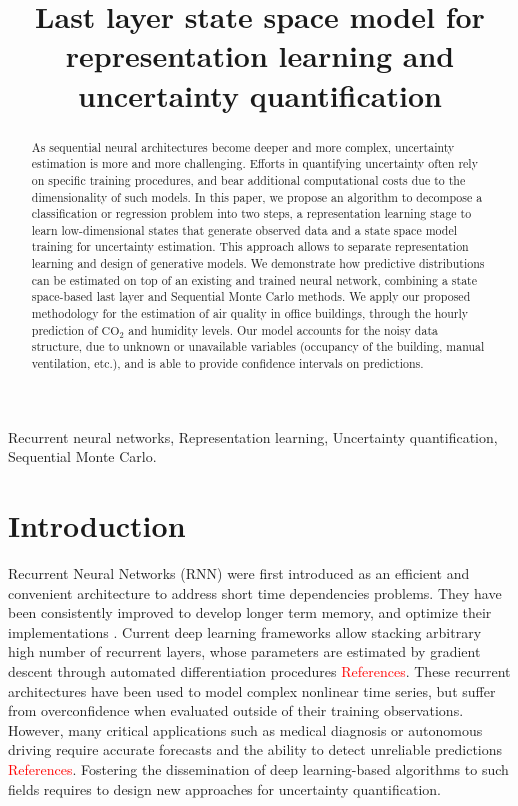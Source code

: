 \documentclass{article}
\title{Last layer state space model for representation learning and uncertainty quantification}
\begin{document}
\maketitle

\begin{abstract}
	As sequential neural architectures become deeper and more complex, uncertainty estimation is more and more challenging.
	Efforts in quantifying uncertainty often rely on specific training procedures, and bear additional computational costs due to the dimensionality of such models. In this paper, we propose an algorithm to decompose a classification or regression problem into two steps,  a representation learning stage to learn low-dimensional states that generate observed data and a state space model training for uncertainty estimation. This approach allows to separate representation learning and design of generative models. We demonstrate how predictive distributions can be estimated on top of an existing and trained neural network, combining a state space-based last layer and Sequential Monte Carlo methods.  We apply our proposed methodology for the estimation of air quality in office buildings, through the hourly prediction of \ensuremath{\mathrm{CO_2}} and humidity levels.
	Our model accounts for the noisy data structure, due to unknown or unavailable variables (occupancy of the building, manual ventilation, etc.), and is able to provide confidence intervals on predictions.
\end{abstract}

\begin{keywords}
	Recurrent neural networks, Representation learning, Uncertainty quantification, Sequential Monte Carlo.
\end{keywords}

\section{Introduction}
\label{sec:intro}

Recurrent Neural Networks (RNN) were first introduced as an efficient and convenient architecture to address short time dependencies problems.
They have been consistently improved to develop longer term memory, and optimize their implementations \cite{Bengio1994LearningLD,Hochreiter1997LongSM}. %
Current deep learning frameworks allow stacking arbitrary high number of recurrent layers, whose parameters are estimated by gradient descent through automated differentiation procedures \textcolor{red}{References}.
These recurrent architectures have been used to model complex nonlinear time series, but suffer from overconfidence when evaluated outside of their training observations. However, many critical applications such as medical diagnosis or autonomous driving require accurate forecasts and the ability to detect unreliable predictions  \textcolor{red}{References}. Fostering the dissemination of deep learning-based algorithms to such fields requires to design new approaches for uncertainty quantification.
\end{document}

